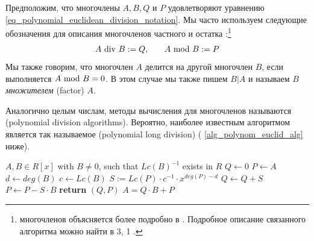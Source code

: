 \begin{notation}
\label{notation_polynomial_euclidean_division_notation}
Предположим, что многочлены $ A, B, Q $ и $ P $ удовлетворяют уравнению \ref{eq_polynomial_euclidean_division_notation}. Мы часто используем следующие обозначения для описания многочленов частного и остатка :\footnote{ многочленов объясняется более подробно в \cite{mignotte-1992}. Подробное описание связанного алгоритма можно найти в \chaptname{} 3, \secname{} 1 \cite{cohen-2010}. }
\begin{equation}
\label{def_polynomial_division_and_modulus}
\begin{array}{lcr}
A \text{ div } B: = Q, & & A \text{ mod } B: = P
\end{array}
\end{equation}
Мы также говорим, что многочлен $ A $ делится на другой многочлен $ B $, если выполняется $ A \text{ mod } B = 0 $. В этом случае мы также пишем $ B | A $ и называем $B$ \textit{множителем} (factor) $A$.
\end{notation}
Аналогично целым числам, методы вычисления  для многочленов называются  (polynomial division algorithms). Вероятно, наиболее известным алгоритмом является так называемое  (polynomial long division) (\algname{} \ref{alg_polynom_euclid_alg} ниже).
\begin{algorithm}\caption{Алгоритм Евклида для многочленов}
\label{alg_polynom_euclid_alg}
\begin{algorithmic}[0]
\Require $A,B \in R[x]$ with $B\neq 0$, such that $Lc(B)^{-1}$ exists in $R$
\State $Q \gets 0$
\State $P \gets A$
\State $d \gets deg(B)$
\State $c \gets Lc(B)$
\State  $S := Lc(P)\cdot c^{-1}\cdot x^{deg(P)-d}$
\State $Q \gets Q + S$
\State $P \gets P - S\cdot B$
\EndWhile
\State \textbf{return} $(Q, P)$
\EndProcedure
\Ensure $ A=  Q \cdot B + P$
\end{algorithmic}
\end{algorithm}

